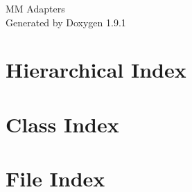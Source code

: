 \let\mypdfximage\pdfximage\def\pdfximage{\immediate\mypdfximage}\documentclass[twoside]{book}
\newcommand{\+}{\discretionary{\mbox{\scriptsize$\hookleftarrow$}}{}{}}
\newcommand{\clearemptydoublepage}{%
  \newpage{\pagestyle{empty}\cleardoublepage}%
}
\begin{document}
\raggedbottom

\hypersetup{pageanchor=false,
             bookmarksnumbered=true,
             pdfencoding=unicode
            }
\begin{titlepage}
\vspace*{7cm}
\begin{center}%
{\Large MM Adapters }\\
\vspace*{1cm}
{\large Generated by Doxygen 1.9.1}\\
\end{center}
\end{titlepage}
\clearemptydoublepage
{}
\tableofcontents
\clearemptydoublepage
{}
\hypersetup{pageanchor=true}

\chapter{Hierarchical Index}

\chapter{Class Index}

\chapter{File Index}

\end{document}
